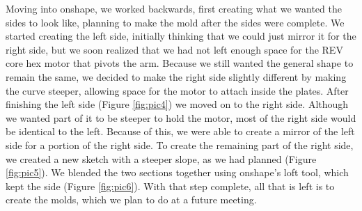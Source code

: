 Moving into onshape, we worked backwards, first creating what we wanted the sides to look like, planning to make the mold after the sides were  complete.  We started creating the left side, initially thinking that we could just mirror it for the right side, but we soon realized that we had not left enough space for the REV core hex motor that pivots the arm.  Because we still wanted the general shape to remain the same, we decided to make the right side slightly different by making the curve steeper, allowing space for the motor to attach inside the plates.  After finishing the left side (Figure \ref{fig:pic4}) we moved on to the right side.  Although we wanted part of it to be steeper to hold the motor, most of the right side would be identical to the left.  Because of this, we were able to create a mirror of the left side for a portion of the right side. To create the remaining part of the right side, we created a new sketch with a steeper slope, as we had planned (Figure \ref{fig:pic5}). We blended the two sections together using onshape’s loft tool, which kept the side (Figure \ref{fig:pic6}).  With that step complete, all that is left is to create the molds, which we plan to do at a future meeting.

 

